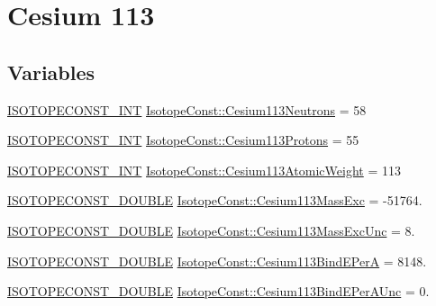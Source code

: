\hypertarget{group___isotope_const-_cesium-_cs113}{}\section{Cesium 113}
\label{group___isotope_const-_cesium-_cs113}
\subsection*{Variables}
\begin{DoxyCompactItemize}
\item 
\mbox{\hyperlink{group___isotope_const-_macros_ga5f18360b3e99483a35c32d789e62621c}{I\+S\+O\+T\+O\+P\+E\+C\+O\+N\+S\+T\+\_\+\+I\+NT}} \mbox{\hyperlink{group___isotope_const-_cesium-_cs113_ga849f84722624391eba85fca51ada52e9}{Isotope\+Const\+::\+Cesium113\+Neutrons}} = 58
\item 
\mbox{\hyperlink{group___isotope_const-_macros_ga5f18360b3e99483a35c32d789e62621c}{I\+S\+O\+T\+O\+P\+E\+C\+O\+N\+S\+T\+\_\+\+I\+NT}} \mbox{\hyperlink{group___isotope_const-_cesium-_cs113_gaca49d9887ea175764d5169cbed28e2eb}{Isotope\+Const\+::\+Cesium113\+Protons}} = 55
\item 
\mbox{\hyperlink{group___isotope_const-_macros_ga5f18360b3e99483a35c32d789e62621c}{I\+S\+O\+T\+O\+P\+E\+C\+O\+N\+S\+T\+\_\+\+I\+NT}} \mbox{\hyperlink{group___isotope_const-_cesium-_cs113_ga5324569d03ed30da15412fe8c880331c}{Isotope\+Const\+::\+Cesium113\+Atomic\+Weight}} = 113
\item 
\mbox{\hyperlink{group___isotope_const-_macros_ga8f45a7272ce02c0b4c65c44636ed719a}{I\+S\+O\+T\+O\+P\+E\+C\+O\+N\+S\+T\+\_\+\+D\+O\+U\+B\+LE}} \mbox{\hyperlink{group___isotope_const-_cesium-_cs113_gaa4a7823cc447d69c842e3b991dfac809}{Isotope\+Const\+::\+Cesium113\+Mass\+Exc}} = -\/51764.
\item 
\mbox{\hyperlink{group___isotope_const-_macros_ga8f45a7272ce02c0b4c65c44636ed719a}{I\+S\+O\+T\+O\+P\+E\+C\+O\+N\+S\+T\+\_\+\+D\+O\+U\+B\+LE}} \mbox{\hyperlink{group___isotope_const-_cesium-_cs113_gaa56223b0f56caff9cb5eb56f69cef531}{Isotope\+Const\+::\+Cesium113\+Mass\+Exc\+Unc}} = 8.
\item 
\mbox{\hyperlink{group___isotope_const-_macros_ga8f45a7272ce02c0b4c65c44636ed719a}{I\+S\+O\+T\+O\+P\+E\+C\+O\+N\+S\+T\+\_\+\+D\+O\+U\+B\+LE}} \mbox{\hyperlink{group___isotope_const-_cesium-_cs113_gac0184f8296dffd660f332f1e3a9c502b}{Isotope\+Const\+::\+Cesium113\+Bind\+E\+PerA}} = 8148.
\item 
\mbox{\hyperlink{group___isotope_const-_macros_ga8f45a7272ce02c0b4c65c44636ed719a}{I\+S\+O\+T\+O\+P\+E\+C\+O\+N\+S\+T\+\_\+\+D\+O\+U\+B\+LE}} \mbox{\hyperlink{group___isotope_const-_cesium-_cs113_ga5ed06cc062b65bcbe0b73b86c7d3cb86}{Isotope\+Const\+::\+Cesium113\+Bind\+E\+Per\+A\+Unc}} = 0.

\end{DoxyCompactItemize}
